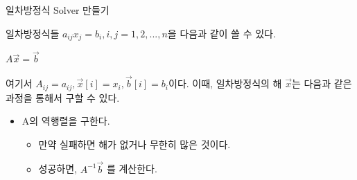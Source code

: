 \documentclass{beamer}
\begin{document}











\begin{frame}{일차방정식 Solver 만들기} 

일차방정식들 $a_{ij}x_j = b_i, i,j = 1,2,...,n$을 다음과 같이 쓸 수 있다. 

$A\vec{x} = \vec{b}$

여기서 $A_{ij} = a_{ij}, \vec{x}[i] = x_i, \vec{b}[i] = b_i$이다. 이때, 일차방정식의 해 $\vec{x}$는 다음과 같은 과정을 통해서 구할 수 있다. 

\begin{itemize} 
\item A의 역행렬을 구한다. 
\begin{itemize} 
\item 만약 실패하면 해가 없거나 무한히 많은 것이다. 
\item 성공하면, $A^{-1} \vec{b}$ 를 계산한다. 
\end{itemize}
\end{itemize}
\end{frame}
\end{document}
